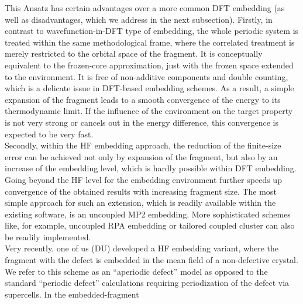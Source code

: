 \documentclass[a4paper,11pt,headings=normal]{scrartcl}
\begin{document}
\begin{itemize}
This Ansatz has certain advantages over a more common DFT embedding (as 
well as disadvantages, which we address in the next subsection). Firstly, in 
contrast to wavefunction-in-DFT type of embedding,  the whole periodic 
system is treated within the same methodological frame, where the correlated 
treatment is merely restricted to the orbital space of the fragment. It is 
conceptually equivalent to the frozen-core approximation, just with the frozen 
space extended to the environment. It is free of non-additive components and 
double counting, which is a delicate issue in  DFT-based embedding schemes. As 
a result, a simple expansion of the fragment leads to a smooth convergence of 
the energy to its thermodynamic limit. If  the influence of the environment on the 
target property is not very strong or cancels out in the energy 
difference, this convergence is expected to be very fast.\\
Secondly, within the HF embedding approach, the reduction of the finite-size 
error can be achieved not only by expansion of the fragment, but also by an 
increase of the embedding level, which is hardly possible within DFT embedding. 
Going beyond the HF level for the embedding environment further speeds up 
convergence of the obtained results with increasing fragment size. The most simple 
approach for such an extension, which is readily available within the existing 
software, is an uncoupled MP2 embedding.\autocite{mullan21} More sophisticated 
schemes like, for example, uncoupled RPA embedding\autocite{schaefer21} or 
tailored coupled cluster\autocite{kats20} can also be readily implemented.\\
Very recently, one of us (DU) developed a HF embedding variant, 
where the fragment with the defect is embedded in the mean field of a 
non-defective crystal.\autocite{Lavroff2024} We refer to this scheme as an 
``aperiodic defect'' model as opposed to the standard ``periodic defect'' 
calculations 
requiring periodization of the defect via supercells. In the embedded-fragment 

\end{itemize}
\end{document}

